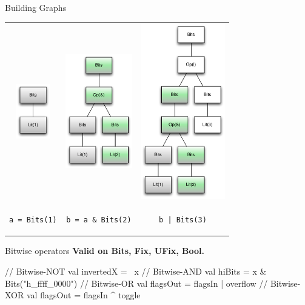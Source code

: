 \documentclass[xcolor=pdflatex,dvipsnames,table]{beamer}
\newcommand{\code}[1]{\begin{footnotesize}{\tt #1}\end{footnotesize}}
\begin{document}
\begin{frame}[fragile]{Building Graphs}
\begin{center}
\begin{tabular}{ccc}
\includegraphics[height=0.94in]{../manual/figs/bits-1.pdf} &
\includegraphics[height=1.96in]{../manual/figs/bits-and.pdf} &
\includegraphics[height=3.0in]{../manual/figs/bits-or-and.pdf} \\
\code{a = Bits(1)} & \code{b = a \& Bits(2)} &
\code{b | Bits(3)} \\
\end{tabular}
\end{center}
\end{frame}

\begin{frame}[fragile]{Bitwise operators}
\textbf{Valid on Bits, Fix, UFix, Bool.}
\begin{scala}
// Bitwise-NOT
val invertedX = ~x                      
// Bitwise-AND 
val hiBits    = x & Bits("h_ffff_0000") 
// Bitwise-OR
val flagsOut  = flagsIn | overflow      
// Bitwise-XOR
val flagsOut  = flagsIn ^ toggle        
\end{scala}
\end{frame}
\end{document}
